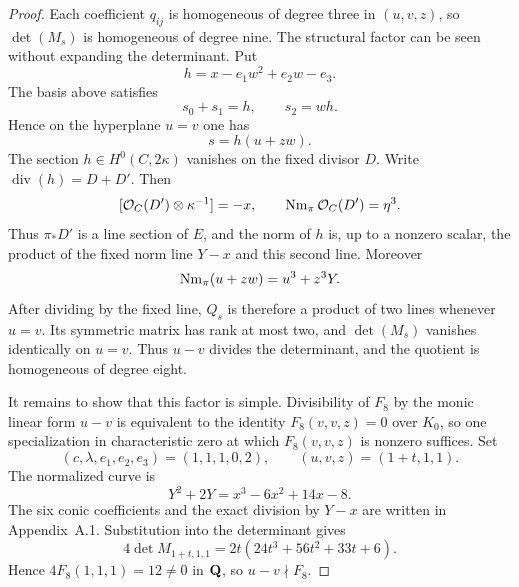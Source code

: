 
\begin{proof}
Each coefficient $q_{ij}$ is homogeneous of degree three in $(u,v,z)$, so
$\det(M_s)$ is homogeneous of degree nine.  The structural factor can be
seen without expanding the determinant.  Put
\[
 h=x-e_1w^2+e_2w-e_3.
\]
The basis above satisfies
\[
 s_0+s_1=h,\qquad s_2=wh.
\]
Hence on the hyperplane $u=v$ one has
\[
 s=h(u+zw).
\]
The section $h\in H^0(C,2\kappa)$ vanishes on the fixed divisor $D$.
Write $\operatorname{div}(h)=D+D'$.  Then
\[
 [\mathcal O_C(D')\otimes\kappa^{-1}]=-x,
 \qquad
 \operatorname{Nm}_\pi\mathcal O_C(D')=\eta^3.
\]
Thus $\pi_*D'$ is a line section of $E$, and the norm of $h$ is, up to a
nonzero scalar, the product of the fixed norm line $Y-x$ and this second
line.  Moreover
\[
 \operatorname{Nm}_\pi(u+zw)=u^3+z^3Y.
\]
After dividing by the fixed line, $Q_s$ is therefore a product of two lines
whenever $u=v$.  Its symmetric matrix has rank at most two, and
$\det(M_s)$ vanishes identically on $u=v$.  Thus $u-v$ divides the
determinant, and the quotient is homogeneous of degree eight.

It remains to show that this factor is simple.  Divisibility of $F_8$ by the
monic linear form $u-v$ is equivalent to the identity
$F_8(v,v,z)=0$ over $K_0$, so one specialization in characteristic zero at
which $F_8(v,v,z)$ is nonzero suffices.  Set
\[
 (c,\lambda,e_1,e_2,e_3)=(1,1,1,0,2),
 \qquad (u,v,z)=(1+t,1,1).
\]
The normalized curve is
\[
 Y^2+2Y=x^3-6x^2+14x-8.
\]
The six conic coefficients and the exact division by $Y-x$ are written in
Appendix~A.1.  Substitution into the determinant gives
\begin{equation}
 4\det M_{1+t,1,1}=2t(24t^3+56t^2+33t+6).
\label{eq:characteristic-zero-simple-factor}
\end{equation}
Hence $4F_8(1,1,1)=12\ne0$ in $\mathbf Q$, so $u-v\nmid F_8$.
\end{proof}


